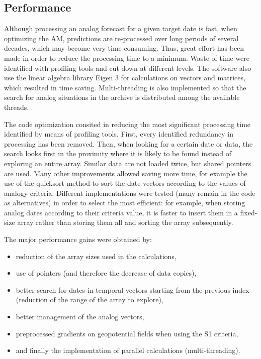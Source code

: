 \documentclass[review]{elsarticle}
\begin{document}
\subsection{Performance}

Although processing an analog forecast for a given target date is fast, when optimizing the AM, predictions are re-processed over long periods of several decades, which may become very time consuming. Thus, great effort has been made in order to reduce the processing time to a minimum. Waste of time were identified with profiling tools and cut down at different levels. The software also use the linear algebra library Eigen 3 \citep{Guennebaud2010} for calculations on vectors and matrices, which resulted in time saving. Multi-threading is also implemented so that the search for analog situations in the archive is distributed among the available threads.

The code optimization consited in reducing the most significant processing time identified by means of profiling tools. First, every identified redundancy in processing has been removed. Then, when looking for a certain date or data, the search looks first in the proximity where it is likely to be found instead of exploring an entire array. Similar data are not loaded twice, but shared pointers are used. Many other improvements allowed saving more time, for example the use of the quicksort method \citep{Hoare1962a} to sort the date vectors according to the values of analogy criteria. Different implementations were tested (many remain in the code as alternatives) in order to select the most efficient: for example, when storing analog dates according to their criteria value, it is faster to insert them in a fixed-size array rather than storing them all and sorting the array subsequently.

The major performance gains were obtained by:
\vspace*{-2mm}
\begin{itemize}
	\setlength\itemsep{-2px}
	\item reduction of the array sizes used in the calculations,
	\item use of pointers (and therefore the decrease of data copies),
	\item better search for dates in temporal vectors starting from the previous index (reduction of the range of the array to explore),
	\item better management of the analog vectors,
	\item preprocessed gradients on geopotential fields when using the S1 criteria,
	\item and finally the implementation of parallel calculations (multi-threading).
\end{itemize}
\end{document}
